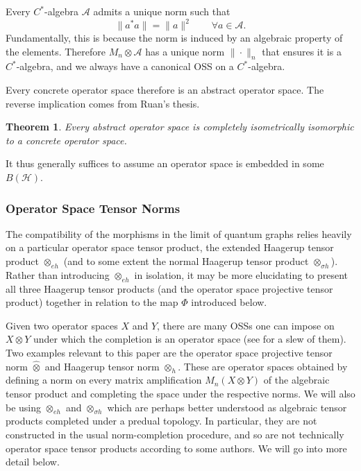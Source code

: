 \documentclass[12pt]{article}
\newtheorem{theorem}{Theorem}[section]
\theoremstyle{definition}
\newenvironment{remark}
  {\pushQED{\qed}\renewcommand{\qedsymbol}{\textcircled{\tiny R}}\remarkx}
  {\popQED\endremarkx}
\newcommand{\mc}[1]{\mathcal{#1}}
\newcommand{\<}{\langle}
\renewcommand{\>}{\rangle}
\renewcommand{\hat}[1]{\widehat{#1}}
\newcommand{\eh}{\otimes_{eh}}
\begin{document}
\begin{remark}
Every $C^*$-algebra $\mc A$ admits a unique norm such that 
\[
\|a^*a\| = \|a\|^2 \qquad \forall a \in \mc A.
\]
Fundamentally, this is because the norm is induced by an algebraic property of the elements. Therefore $M_n \otimes \mc A$ has a unique norm $\|\cdot \|_n$ that ensures it is a $C^*$-algebra, and we always have a canonical OSS on a $C^*$-algebra. 
\end{remark}

Every concrete operator space therefore is an abstract operator space. The reverse implication comes from Ruan's thesis.

\begin{theorem} \cite[Theorem 3.1]{ruan}
    Every abstract operator space is completely isometrically isomorphic to a concrete operator space.
\end{theorem}

It thus generally suffices to assume an operator space is embedded in some $B(\mc H)$.

\subsubsection{Operator Space Tensor Norms}

The compatibility of the morphisms in the limit of quantum graphs relies heavily on a particular operator space tensor product, the extended Haagerup tensor product $\otimes_{eh}$ (and to some extent the normal Haagerup tensor product $\otimes_{\sigma h}$). Rather than introducing $\otimes_{eh}$ in isolation, it may be more elucidating to present all three Haagerup tensor products (and the operator space projective tensor product) together in relation to the map $\Phi$ introduced below.

Given two operator spaces $X$ and $Y$, there are many OSSs one can impose on $X \otimes Y$ under which the completion is an operator space (see \cite{opsptennorm} for a slew of them). Two examples relevant to this paper are the operator space projective tensor norm $\hat \otimes$ and Haagerup tensor norm $\otimes_h$. These are operator spaces obtained by defining a norm on every matrix amplification $M_n(X \otimes Y)$ of the algebraic tensor product and completing the space under the respective norms. We will also be using $\eh$ and $\otimes_{\sigma h}$ which are perhaps better understood as algebraic tensor products completed under a predual topology. In particular, they are not constructed in the usual norm-completion procedure, and so are not technically operator space tensor products according to some authors. We will go into more detail below. 
\end{document}
